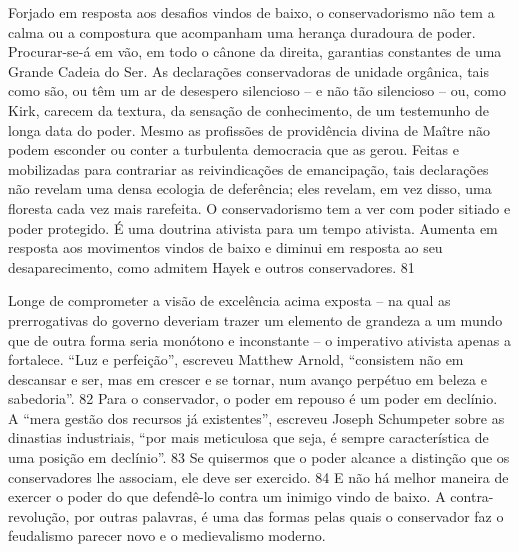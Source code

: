  
\par
 
Forjado em resposta aos desafios vindos de baixo, o conservadorismo não tem a calma ou a compostura que acompanham uma herança duradoura de poder. Procurar-se-á em vão, em todo o cânone da direita, garantias constantes de uma Grande Cadeia do Ser. As declarações conservadoras de unidade orgânica, tais como são, ou têm um ar de desespero silencioso – e não tão silencioso – ou, como Kirk, carecem da textura, da sensação de conhecimento, de um testemunho de longa data do poder. Mesmo as profissões de providência divina de Maître não podem esconder ou conter a turbulenta democracia que as gerou. Feitas e mobilizadas para contrariar as reivindicações de emancipação, tais declarações não revelam uma densa ecologia de deferência; eles revelam, em vez disso, uma floresta cada vez mais rarefeita. O conservadorismo tem a ver com poder sitiado e poder protegido. É uma doutrina ativista para um tempo ativista. Aumenta em resposta aos movimentos vindos de baixo e diminui em resposta ao seu desaparecimento, como admitem Hayek e outros conservadores.
 {\color{blue} 81}  

 
\par
 
Longe de comprometer a visão de excelência acima exposta – na qual as prerrogativas do governo deveriam trazer um elemento de grandeza a um mundo que de outra forma seria monótono e inconstante – o imperativo ativista apenas a fortalece. “Luz e perfeição”, escreveu Matthew Arnold, “consistem não em descansar e ser, mas em crescer e se tornar, num avanço perpétuo em beleza e sabedoria”.
 {\color{blue} 82}  
Para o conservador, o poder em repouso é um poder em declínio. A “mera gestão dos recursos já existentes”, escreveu Joseph Schumpeter sobre as dinastias industriais, “por mais meticulosa que seja, é sempre característica de uma posição em declínio”.
 {\color{blue} 83}  
Se quisermos que o poder alcance a distinção que os conservadores lhe associam, ele deve ser exercido.
 {\color{blue} 84}  
E não há melhor maneira de exercer o poder do que defendê-lo contra um inimigo vindo de baixo. A contra-revolução, por outras palavras, é uma das formas pelas quais o conservador faz o feudalismo parecer novo e o medievalismo moderno.
 
\par
 
